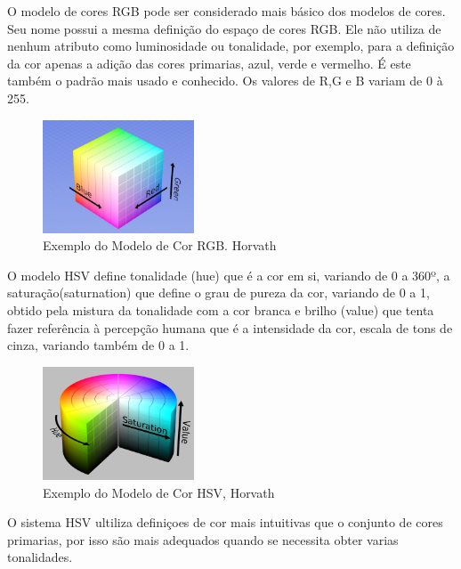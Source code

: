 O modelo de cores RGB pode ser considerado mais básico dos modelos de cores. Seu nome possui a mesma definição do espaço de cores RGB. Ele não utiliza de nenhum atributo como luminosidade ou tonalidade, por exemplo, para a definição da cor apenas a adição das cores primarias, azul, verde e vermelho. É este também o padrão mais usado e conhecido. Os valores de R,G e B variam de 0 à 255.


\begin{figure}[!h]
	\centering
	\includegraphics[width=0.4\textwidth]{rgb.pdf}
	
\caption{Exemplo do Modelo de Cor RGB.	 Horvath\cite{ImagensHSLHSVRGB}  }
	\label{ModeloRGB}
\end{figure}



O modelo HSV define tonalidade (hue) que é a cor em si, variando de 0 a 360º, a saturação(saturnation) que define o grau de pureza da cor, variando de 0 a 1, obtido pela mistura da tonalidade com a cor branca e brilho (value) que tenta fazer referência à percepção humana\cite{Leao:2005} que é a intensidade da cor, escala de tons de cinza\cite{Azevedo:2003}, variando também de 0 a 1.


\begin{figure}[!h]
	\centering
	\includegraphics[width=0.4\textwidth]{hsv.pdf}
	
	\caption{Exemplo do Modelo de Cor HSV, Horvath\cite{ImagensHSLHSVRGB}}
	\label{ModeloHSV}
\end{figure} 


O sistema HSV ultiliza definiçoes de cor mais intuitivas que o conjunto de cores primarias, por isso são mais adequados quando se necessita obter varias tonalidades.

